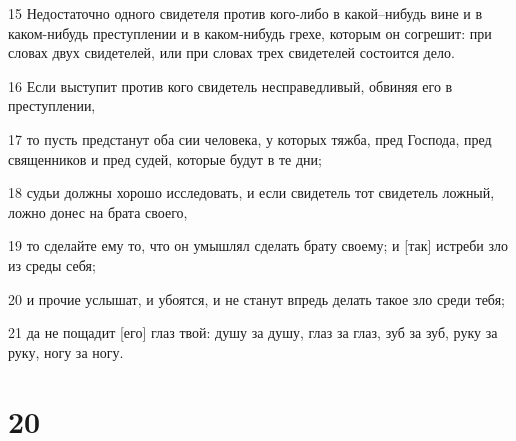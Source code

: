 \par 15 Недостаточно одного свидетеля против кого-либо в какой--нибудь вине и в каком-нибудь преступлении и в каком-нибудь грехе, которым он согрешит: при словах двух свидетелей, или при словах трех свидетелей состоится дело.
\par 16 Если выступит против кого свидетель несправедливый, обвиняя его в преступлении,
\par 17 то пусть предстанут оба сии человека, у которых тяжба, пред Господа, пред священников и пред судей, которые будут в те дни;
\par 18 судьи должны хорошо исследовать, и если свидетель тот свидетель ложный, ложно донес на брата своего,
\par 19 то сделайте ему то, что он умышлял сделать брату своему; и [так] истреби зло из среды себя;
\par 20 и прочие услышат, и убоятся, и не станут впредь делать такое зло среди тебя;
\par 21 да не пощадит [его] глаз твой: душу за душу, глаз за глаз, зуб за зуб, руку за руку, ногу за ногу.

\chapter{20}

